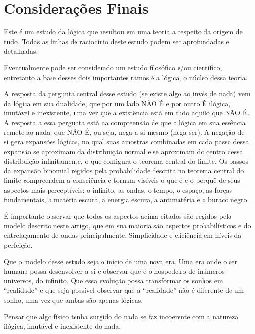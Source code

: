 \section*{Considerações Finais}
Este é um estudo da lógica que resultou em uma teoria a respeito da origem de tudo. Todas as linhas de raciocínio deste estudo podem ser aprofundadas e detalhadas. 

Eventualmente pode ser considerado um estudo filosófico e/ou científico, entretanto a base desses dois importantes ramos é a lógica, o núcleo dessa teoria. 

A resposta da pergunta central desse estudo (se existe algo ao invés de nada) vem da lógica em sua dualidade, que por um lado NÃO É e por outro É ilógica, imutável e inexistente, uma vez que a existência está em tudo aquilo que NÃO É. A resposta a essa pergunta está na compreensão de que a lógica em sua essência remete ao nada, que NÃO É, ou seja, nega a si mesmo (nega ser). A negação de si gera expansões lógicas, no qual suas amostras combinadas em cada passo dessa expansão se aproximam da distribuição normal e se aproximam do centro dessa distribuição infinitamente, o que configura o teorema central do limite. Os passos da expansão binomial regidos pela probabilidade descrita no teorema central do limite compreendem a consciência e tornam visíveis o que é e o porquê de seus aspectos mais perceptíveis: o infinito, as ondas, o tempo, o espaço, as forças fundamentais, a matéria escura, a energia escura, a antimatéria e o buraco negro.

É importante observar que todos os aspectos acima citados são regidos pelo modelo descrito neste artigo, que em sua maioria são aspectos probabilísticos e do entrelaçamento de ondas principalmente. Simplicidade e eficiência em níveis da perfeição.

Que o modelo desse estudo seja o início de uma nova era. Uma era onde o ser humano possa desenvolver a si e observar que é o hospedeiro de inúmeros universos, do infinito. Que essa evolução possa transformar os sonhos em “realidade” e que seja possível observar que a “realidade” não é diferente de um sonho, uma vez que ambas são apenas lógicas.

Pensar que algo físico tenha surgido do nada se faz incoerente com a natureza ilógica, imutável e inexistente do nada.